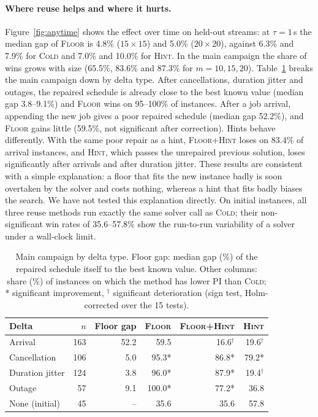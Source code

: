 \documentclass[letterpaper]{article} %
\newcommand{\mcold}{\textsc{Cold}}
\newcommand{\mhint}{\textsc{Hint}}
\newcommand{\mfloor}{\textsc{Floor}}
\newcommand{\mfh}{\textsc{Floor+Hint}}
\begin{document}
\paragraph{Where reuse helps and where it hurts.} Figure~\ref{fig:anytime} shows the effect over time on held-out streams: at $\tau=1$\,s the median gap of \mfloor{} is 4.8\% ($15{\times}15$) and 5.0\% ($20{\times}20$), against 6.3\% and 7.9\% for \mcold{} and 7.0\% and 10.0\% for \mhint. In the main campaign the share of wins grows with size (65.5\%, 83.6\% and 87.3\% for $m = 10, 15, 20$). Table~\ref{tab:delta} breaks the main campaign down by delta type. After cancellations, duration jitter and outages, the repaired schedule is already close to the best known value (median gap 3.8--9.1\%) and \mfloor{} wins on 95--100\% of instances. After a job arrival, appending the new job gives a poor repaired schedule (median gap 52.2\%), and \mfloor{} gains little (59.5\%, not significant after correction). Hints behave differently. With the same poor repair as a hint, \mfh{} loses on 83.4\% of arrival instances, and \mhint, which passes the unrepaired previous solution, loses significantly after arrivals and after duration jitter. These results are consistent with a simple explanation: a floor that fits the new instance badly is soon overtaken by the solver and costs nothing, whereas a hint that fits badly biases the search. We have not tested this explanation directly. On initial instances, all three reuse methods run exactly the same solver call as \mcold; their non-significant win rates of 35.6--57.8\% show the run-to-run variability of a solver under a wall-clock limit.

\begin{table}[t]
\centering
\small
\setlength{\tabcolsep}{3.2pt}
\begin{tabular}{lrrrrr}
\toprule
Delta & $n$ & Floor gap & \mfloor & \mfh & \mhint \\
\midrule
Arrival & 163 & 52.2 & 59.5\phantom{*} & 16.6$^\dagger$ & 19.6$^\dagger$ \\
Cancellation & 106 & 5.0 & 95.3* & 86.8* & 79.2* \\
Duration jitter & 124 & 3.8 & 96.0* & 87.9* & 19.4$^\dagger$ \\
Outage & 57 & 9.1 & 100.0* & 77.2* & 36.8\phantom{*} \\
None (initial) & 45 & -- & 35.6\phantom{*} & 35.6\phantom{*} & 57.8\phantom{*} \\
\bottomrule
\end{tabular}
\caption{Main campaign by delta type. Floor gap: median gap (\%) of the repaired schedule itself to the best known value. Other columns: share (\%) of instances on which the method has lower PI than \mcold; * significant improvement, $^\dagger$ significant deterioration (sign test, Holm-corrected over the 15 tests).}
\label{tab:delta}
\end{table}
\end{document}
